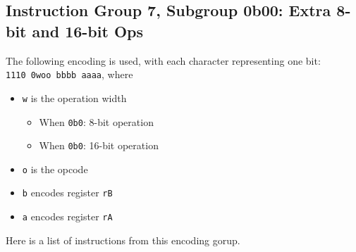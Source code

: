 \documentclass{article}
\begin{document}
	\subsection{Instruction Group 7, Subgroup 0b00:
		Extra 8-bit and 16-bit Ops}
	The following encoding is used, with each character representing one
	bit: \\
	\texttt{1110 0woo bbbb aaaa}, where

	\singlespacing
	\begin{itemize}
	\item \texttt{w} is the operation width
		\begin{itemize}
		\item When \texttt{0b0}:
			8-bit operation
		\item When \texttt{0b0}:
			16-bit operation
		\end{itemize}
	\item \texttt{o} is the opcode
	\item \texttt{b} encodes register \texttt{rB}
	\item \texttt{a} encodes register \texttt{rA}
	\end{itemize}
	\doublespacing

	Here is a list of instructions from this encoding gorup.
\end{document}
